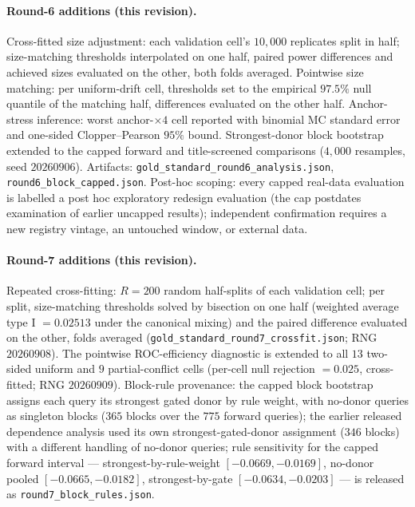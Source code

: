 \documentclass[11pt]{article}
\begin{document}
\paragraph{Round-6 additions (this revision).} Cross-fitted size
adjustment: each validation cell's $10{,}000$ replicates split in half;
size-matching thresholds interpolated on one half, paired power
differences and achieved sizes evaluated on the other, both folds
averaged. Pointwise size matching: per uniform-drift cell, thresholds set
to the empirical $97.5\%$ null quantile of the matching half, differences
evaluated on the other half. Anchor-stress inference: worst
anchor-$\times 4$ cell reported with binomial MC standard error and
one-sided Clopper--Pearson $95\%$ bound. Strongest-donor block bootstrap
extended to the capped forward and title-screened comparisons ($4{,}000$
resamples, seed $20260906$). Artifacts:
\texttt{gold\_standard\_\allowbreak round6\_analysis.json},
\texttt{round6\_block\_capped.json}. Post-hoc scoping: every capped
real-data evaluation is labelled a post hoc exploratory redesign
evaluation (the cap postdates examination of earlier uncapped results);
independent confirmation requires a new registry vintage, an untouched
window, or external data.

\paragraph{Round-7 additions (this revision).} Repeated cross-fitting:
$R = 200$ random half-splits of each validation cell; per split,
size-matching thresholds solved by bisection on one half (weighted
average type I $= 0.02513$ under the canonical mixing) and the paired
difference evaluated on the other, folds averaged
(\texttt{gold\_standard\_round7\_crossfit.json}; RNG $20260908$). The
pointwise ROC-efficiency diagnostic is extended to all $13$ two-sided
uniform and $9$ partial-conflict cells (per-cell null rejection $=
0.025$, cross-fitted; RNG $20260909$). Block-rule provenance: the capped
block bootstrap assigns each query its strongest gated donor by rule
weight, with no-donor queries as singleton blocks ($365$ blocks over the
$775$ forward queries); the earlier released dependence analysis used its
own strongest-gated-donor assignment ($346$ blocks) with a different
handling of no-donor queries; rule sensitivity for the capped forward
interval --- strongest-by-rule-weight $[-0.0669,-0.0169]$, no-donor
pooled $[-0.0665,-0.0182]$, strongest-by-gate $[-0.0634,-0.0203]$ --- is
released as \texttt{round7\_block\_rules.json}.
\end{document}
